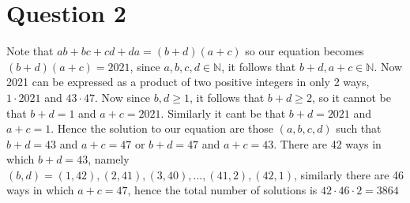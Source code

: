\documentclass[11pt]{article}
\begin{document}
\section*{Question 2}
Note that $ab+bc+cd+da=(b+d)(a+c)$ so our equation becomes $(b+d)(a+c)=2021$, since $a,b,c,d\in\mathbb{N}$, it follows that $b+d,a+c\in\mathbb{N}$. Now 2021 can be expressed as a product of two positive integers in only 2 ways, $1\cdot2021$ and $43\cdot47$. Now since $b,d\geq 1$, it follows that $b+d\geq 2$, so it cannot be that $b+d=1$ and $a+c=2021$. Similarly it cant be that $b+d=2021$ and $a+c=1$. Hence the solution to our equation are those $(a,b,c,d)$ such that $b+d=43$ and $a+c=47$ or $b+d=47$ and $a+c=43$. There are 42 ways in which $b+d=43$, namely $(b,d)=(1,42),(2,41),(3,40),...,(41,2),(42,1)$, similarly there are 46 ways in which $a+c=47$, hence the total number of solutions is $42\cdot46\cdot2=3864$
\end{document}
